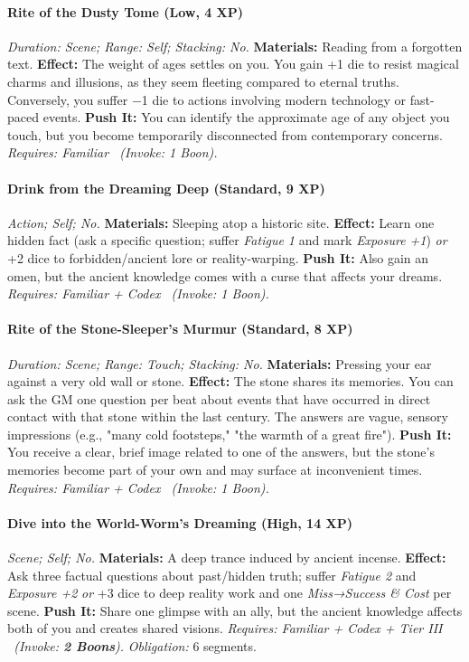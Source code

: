 \paragraph{Rite of the Dusty Tome (Low, 4 XP)} \emph{Duration: Scene; Range: Self; Stacking: No.}
\textbf{Materials:} Reading from a forgotten text.
\textbf{Effect:} The weight of ages settles on you. You gain +1 die to resist magical charms and illusions, as they seem fleeting compared to eternal truths. Conversely, you suffer −1 die to actions involving modern technology or fast-paced events.
\textbf{Push It:} You can identify the approximate age of any object you touch, but you become temporarily disconnected from contemporary concerns.
\emph{Requires: Familiar \ (\textit{Invoke:} 1 Boon).}
\paragraph{Drink from the Dreaming Deep (Standard, 9 XP)} \emph{Action; Self; No.}
\textbf{Materials:} Sleeping atop a historic site.
\textbf{Effect:} Learn one hidden fact (ask a specific question; suffer \emph{Fatigue 1} and mark \emph{Exposure +1}) \emph{or} +2 dice to forbidden/ancient lore or reality-warping.
\textbf{Push It:} Also gain an omen, but the ancient knowledge comes with a curse that affects your dreams.
\emph{Requires: Familiar + Codex \ (\textit{Invoke:} 1 Boon).}
\paragraph{Rite of the Stone-Sleeper's Murmur (Standard, 8 XP)} \emph{Duration: Scene; Range: Touch; Stacking: No.}
\textbf{Materials:} Pressing your ear against a very old wall or stone.
\textbf{Effect:} The stone shares its memories. You can ask the GM one question per beat about events that have occurred in direct contact with that stone within the last century. The answers are vague, sensory impressions (e.g., "many cold footsteps," "the warmth of a great fire").
\textbf{Push It:} You receive a clear, brief image related to one of the answers, but the stone's memories become part of your own and may surface at inconvenient times.
\emph{Requires: Familiar + Codex \ (\textit{Invoke:} 1 Boon).}
\paragraph{Dive into the World-Worm's Dreaming (High, 14 XP)} \emph{Scene; Self; No.}
\textbf{Materials:} A deep trance induced by ancient incense.
\textbf{Effect:} Ask three factual questions about past/hidden truth; suffer \emph{Fatigue 2} and \emph{Exposure +2} \emph{or} +3 dice to deep reality work and one \emph{Miss→Success \& Cost} per scene.
\textbf{Push It:} Share one glimpse with an ally, but the ancient knowledge affects both of you and creates shared visions.
\emph{Requires: Familiar + Codex + Tier III \ (\textit{Invoke:} \textbf{2 Boons}).}
\emph{Obligation:} 6 segments.

